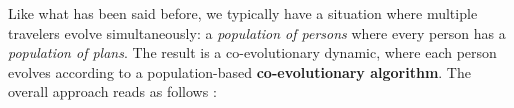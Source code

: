 
Like what has been said before, we typically have a
situation where multiple travelers evolve simultaneously:
 a \emph{population of persons} where every person has a
\emph{population of plans}.  The result is a co-evolutionary dynamic,
where each person evolves according to a population-based
\textbf{co-evolutionary algorithm}.  The overall approach reads as
follows \citep[see, e.g.,][for similar
  approaches]{HraberJonesForrestEcho,ArthurBar}:

